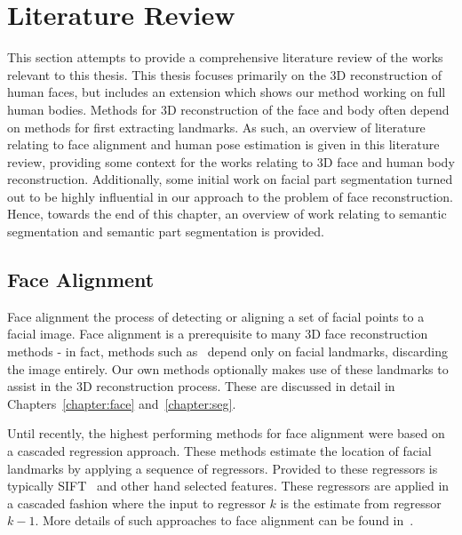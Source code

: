 \chapter{Literature Review}
\label{chapter:literature}


This section attempts to provide a comprehensive literature review of
the works relevant to this thesis. This thesis focuses primarily on
the 3D reconstruction of human faces, but includes an extension which
shows our method working on full human bodies. Methods for 3D
reconstruction of the face and body often depend on methods for first
extracting landmarks. As such, an overview of literature relating to
face alignment and human pose estimation is given in this literature
review, providing some context for the works relating to 3D face and
human body reconstruction. Additionally, some initial work on facial
part segmentation turned out to be highly influential in our approach
to the problem of face reconstruction. Hence, towards the end of this
chapter, an overview of work relating to semantic segmentation and
semantic part segmentation is provided.

\section{Face Alignment}

Face alignment the process of detecting or aligning a set of facial
points to a facial image. Face alignment is a prerequisite to many 3D
face reconstruction methods - in fact, methods such
as~\cite{huber2016multiresolution} depend only on facial landmarks,
discarding the image entirely. Our own methods optionally makes use of
these landmarks to assist in the 3D reconstruction process. These are
discussed in detail in Chapters~\ref{chapter:face} and~\ref{chapter:seg}.

Until recently, the highest performing methods for face alignment were
based on a cascaded regression approach. These methods estimate the
location of facial landmarks by applying a sequence of
regressors. Provided to these regressors is typically
SIFT~\cite{lowe2004distinctive} and other hand selected
features. These regressors are applied in a cascaded fashion where the
input to regressor $k$ is the estimate from regressor $k-1$. More
details of such approaches to face alignment can be found
in~\cite{sanchez16,cao2014facewarehouse,xiongsupervised,zhu2015face,tzimiropoulos2015project}.

